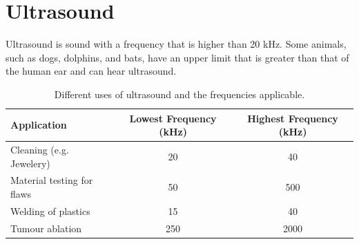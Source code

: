             \section{Ultrasound}
            \nopagebreak
      \label{m38800*id185135}Ultrasound is sound with a frequency that is higher than 20 kHz. Some animals, such as dogs, dolphins, and bats, have an upper limit that is greater than that of the human ear and can hear ultrasound.
          \begin{table}[H]
        \begin{center}
      \label{m38800*eip-558}
    \noindent
      \begin{tabular}{|l|c|c|}\hline
        Application &
        Lowest Frequency (kHz) &
        Highest Frequency (kHz) \\ \hline
        Cleaning (e.g. Jewelery) &
        20 &
        40 \\ \hline
        Material testing for flaws &
        50 &
        500 \\ \hline
        Welding of plastics &
        15 &
        40 \\ \hline
        Tumour ablation &
        250 &
        2000 \\ \hline
    \end{tabular}
      \end{center}
    \caption{Different uses of ultrasound and the frequencies applicable.}
\end{table}
    \par
  \par 

